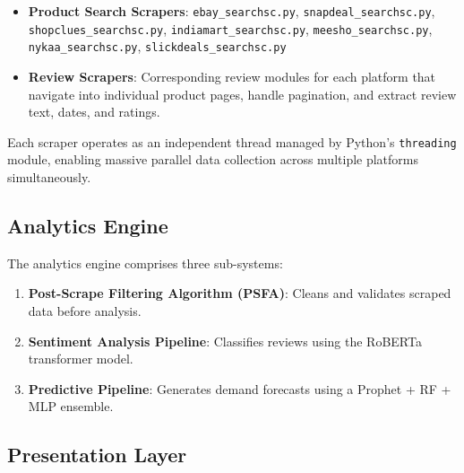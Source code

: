 \documentclass[conference]{IEEEtran}
\begin{document}
\begin{itemize}
    \item \textbf{Product Search Scrapers}: \texttt{ebay\_searchsc.py}, \texttt{snapdeal\_searchsc.py}, \texttt{shopclues\_searchsc.py}, \texttt{indiamart\_searchsc.py}, \texttt{meesho\_searchsc.py}, \texttt{nykaa\_searchsc.py}, \texttt{slickdeals\_searchsc.py}
    \item \textbf{Review Scrapers}: Corresponding review modules for each platform that navigate into individual product pages, handle pagination, and extract review text, dates, and ratings.
\end{itemize}

Each scraper operates as an independent thread managed by Python's \texttt{threading} module, enabling massive parallel data collection across multiple platforms simultaneously.

\subsection{Analytics Engine}

The analytics engine comprises three sub-systems:
\begin{enumerate}
    \item \textbf{Post-Scrape Filtering Algorithm (PSFA)}: Cleans and validates scraped data before analysis.
    \item \textbf{Sentiment Analysis Pipeline}: Classifies reviews using the RoBERTa transformer model.
    \item \textbf{Predictive Pipeline}: Generates demand forecasts using a Prophet + RF + MLP ensemble.
\end{enumerate}

\subsection{Presentation Layer}
\end{document}
